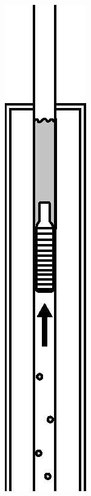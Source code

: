 \begin{figure}[htbp]
    {\centering \includegraphics[height=.3\textheight]{fig/foamer/plunger-conventional/conventionalplunger-B.eps} \label{fig:plunger-conventional-B}}  \qquad \qquad
    \subfloat[][]

\end{figure}
